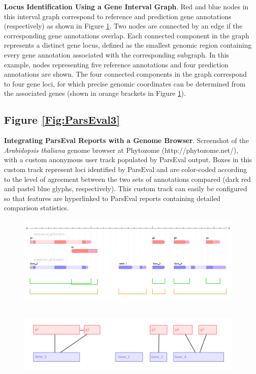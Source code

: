 \noindent
\textbf{Locus Identification Using a Gene Interval Graph}.
Red and blue nodes in this interval graph correspond to reference and prediction
gene annotations (respectively) as shown in Figure \ref{Fig:ParsEval1}. Two nodes are connected by an edge if the corresponding gene annotations overlap. Each
connected component in the graph represents a distinct
gene locus, defined as the smallest genomic region containing every gene annotation
associated with the corresponding subgraph. In this example, nodes representing five reference annotations and four prediction annotations are
shown. The four connected components in the graph correspond to four gene loci, for which precise genomic coordinates can be determined from
the associated genes (shown in orange brackets in Figure \ref{Fig:ParsEval1}).

\subsection*{Figure \ref{Fig:ParsEval3}}

\noindent
\textbf{Integrating ParsEval Reports with a Genome Browser}.
Screenshot of the \textit{Arabidopsis thaliana} genome browser at Phytozome (http://phytozome.net/), with a custom anonymous user track populated by ParsEval output. Boxes in this custom track represent loci identified by ParsEval
and are color-coded according to the level of agreement between the two sets of annotations compared (dark red and pastel blue glyphs,
respectively). This custom track can easily be configured so that features are hyperlinked to ParsEval reports containing detailed comparison statistics.

\begin{figure}[h]
\centering
\includegraphics[width=6in]{Assets/Graphics/ParsEval/figure-1.png}
\caption{~}
\label{Fig:ParsEval1}
\end{figure}

\begin{figure}[h]
\centering
\includegraphics[width=6in]{Assets/Graphics/ParsEval/figure-2.png}
\caption{~}
\label{Fig:ParsEval2}
\end{figure}

